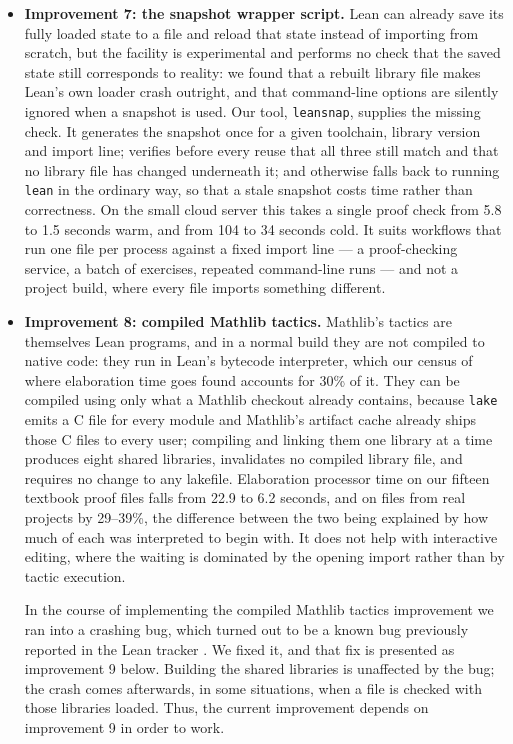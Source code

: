 \documentclass{article}
\newcommand{\Lean}{Lean\xspace}      %
\newcommand{\lean}{\texttt{lean}\xspace}      %
\newcommand{\lake}{\texttt{lake}\xspace}      %
\newcommand{\mathlib}{Mathlib\xspace}
\begin{document}
\begin{itemize}

\item \textbf{Improvement 7: the snapshot wrapper script.} \Lean can already save its fully loaded state to a file and reload that state instead of importing from scratch, but the facility is experimental and performs no check that the saved state still corresponds to reality: we found that a rebuilt library file makes \Lean's own loader crash outright, and that command-line options are silently ignored when a snapshot is used. Our tool, \texttt{leansnap}, supplies the missing check. It generates the snapshot once for a given toolchain, library version and import line; verifies before every reuse that all three still match and that no library file has changed underneath it; and otherwise falls back to running \lean in the ordinary way, so that a stale snapshot costs time rather than correctness. On the small cloud server this takes a single proof check from 5.8 to 1.5 seconds warm, and from 104 to 34 seconds cold. It suits workflows that run one file per process against a fixed import line --- a proof-checking service, a batch of exercises, repeated command-line runs --- and not a project build, where every file imports something different.

\item \textbf{Improvement 8: compiled \mathlib tactics.} \mathlib's tactics are themselves \Lean programs, and in a normal build they are not compiled to native code: they run in \Lean's bytecode interpreter, which our census of where elaboration time goes found accounts for 30\% of it. They can be compiled using only what a \mathlib checkout already contains, because \lake emits a C file for every module and \mathlib's artifact cache already ships those C files to every user; compiling and linking them one library at a time produces eight shared libraries, invalidates no compiled library file, and requires no change to any lakefile. Elaboration processor time on our fifteen textbook proof files falls from 22.9 to 6.2 seconds, and on files from real projects by 29--39\%, the difference between the two being explained by how much of each was interpreted to begin with. It does not help with interactive editing, where the waiting is dominated by the opening import rather than by tactic execution. 

In the course of implementing the compiled \mathlib tactics improvement we ran into a crashing bug, which turned out to be a known bug previously reported in the \Lean tracker \cite{lean14359}. We fixed it, and that fix is presented as improvement 9 below. Building the shared libraries is unaffected by the bug; the crash comes afterwards, in some situations, when a file is checked with those libraries loaded. Thus, the current improvement depends on improvement 9 in order to work.

\end{itemize}
\end{document}
